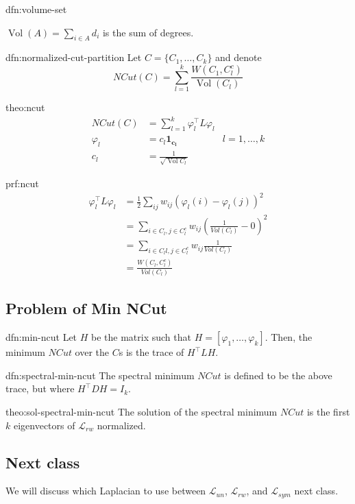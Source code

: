\documentclass[12pt]{article}
\theoremstyle{plain}
\DeclareMathOperator*{\vol}{Vol}
\begin{document}
\begin{dfn}{dfn:volume-set}

$ \vol(A) = \sum_{i \in A} d_i $ is the sum of degrees.

\end{dfn}

\begin{dfn}{dfn:normalized-cut-partition}
Let $ C = \{ C_1, \ldots, C_k \} $ and denote
\[
NCut(C) = \sum_{l = 1}^k \frac{W(C_1, C_l^c) }{ \vol{(C_l)} }
\]

\end{dfn}

\begin{theo}[NCut]{theo:ncut}
  \begin{align*}
    NCut(C) &= \sum_{l = 1}^{k} \varphi_l^{\intercal} L \varphi_{l} \\
    \varphi_l &= c_{l} \mathbf{1_{c_{l}}} & l = 1, \ldots, k \\
    c_l &= \frac{1}{\sqrt{\vol{C_l}}}
  \end{align*}
\end{theo}

\begin{prf}{prf:ncut}
	\begin{align*}
		\varphi_l^{\intercal} L \varphi_{l} &= \frac{1}{2} \sum_{ij} w_{ij}(\varphi_l(i) - \varphi_l(j))^2 \\
		&= \sum_{i \in C_l, j \in C_l^c} w_{ij} (\frac{1}{Vol(C_l)} - 0)^2 \\
		&= \sum_{i \in C_ll, j \in C_l^c} w_{ij} \frac{1}{Vol(C_l)} \\
		&= \frac{W(C_l,C_l^c)}{Vol(C_l)}
	\end{align*}
\end{prf}

\subsection{Problem of Min NCut}
\begin{dfn}{dfn:min-ncut}
	Let $ H $ be the matrix such that $ H = [\varphi_1, \ldots, \varphi_k] $.
	Then, the minimum $ NCut $ over the $ C $s is the trace of $ H^{\intercal} L H $.
\end{dfn}
\begin{dfn}{dfn:spectral-min-ncut}
The spectral minimum $ NCut $ is defined to be the above trace, but where $ H^{\intercal} D H = I_{k} $.
\end{dfn}
\begin{theo}{theo:sol-spectral-min-ncut}
  The solution of the spectral minimum $ NCut $ is the first $ k $ eigenvectors of $ \mathcal{L}_{rw} $ normalized.
\end{theo}

\subsection{Next class}

We will discuss which Laplacian to use between $\mathcal{L}_{un}$, $\mathcal{L}_{rw}$, and $\mathcal{L}_{sym}$ next class.

{}

\end{document}
